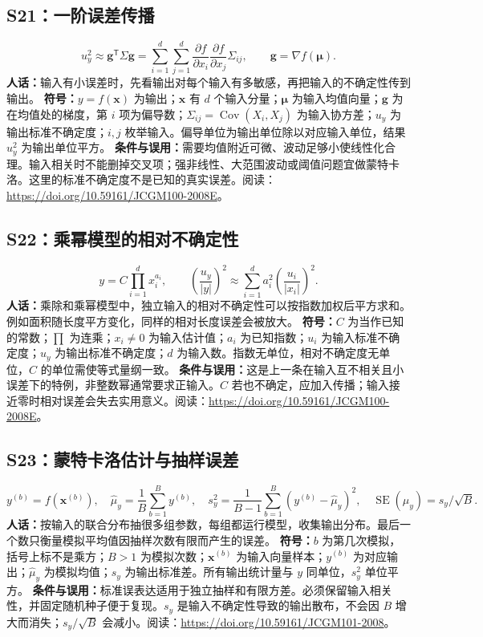 \documentclass[UTF8,zihao=-4,openany,oneside,fontset=windows]{ctexbook}
\begin{document}
\subsection{S21：一阶误差传播}
\begin{equation}
 u_y^2\approx\mathbf g^{\mathsf T}\Sigma\mathbf g
 =\sum_{i=1}^{d}\sum_{j=1}^{d}
 \frac{\partial f}{\partial x_i}\frac{\partial f}{\partial x_j}\Sigma_{ij},\qquad
 \mathbf g=\nabla f(\boldsymbol\mu).
\end{equation}
\textbf{人话：}输入有小误差时，先看输出对每个输入有多敏感，再把输入的不确定性传到输出。
\textbf{符号：}$y=f(\mathbf x)$ 为输出；$\mathbf x$ 有 $d$ 个输入分量；$\boldsymbol\mu$ 为输入均值向量；$\mathbf g$ 为在均值处的梯度，第 $i$ 项为偏导数；$\Sigma_{ij}=\operatorname{Cov}(X_i,X_j)$ 为输入协方差；$u_y$ 为输出标准不确定度；$i,j$ 枚举输入。偏导单位为输出单位除以对应输入单位，结果 $u_y^2$ 为输出单位平方。
\textbf{条件与误用：}需要均值附近可微、波动足够小使线性化合理。输入相关时不能删掉交叉项；强非线性、大范围波动或阈值问题宜做蒙特卡洛。这里的标准不确定度不是已知的真实误差。阅读：\url{https://doi.org/10.59161/JCGM100-2008E}。

\subsection{S22：乘幂模型的相对不确定性}
\begin{equation}
 y=C\prod_{i=1}^{d}x_i^{a_i},\qquad
 \left(\frac{u_y}{|y|}\right)^2\approx
 \sum_{i=1}^{d}a_i^2\left(\frac{u_i}{|x_i|}\right)^2.
\end{equation}
\textbf{人话：}乘除和乘幂模型中，独立输入的相对不确定性可以按指数加权后平方求和。例如面积随长度平方变化，同样的相对长度误差会被放大。
\textbf{符号：}$C$ 为当作已知的常数；$\prod$ 为连乘；$x_i\ne0$ 为输入估计值；$a_i$ 为已知指数；$u_i$ 为输入标准不确定度；$u_y$ 为输出标准不确定度；$d$ 为输入数。指数无单位，相对不确定度无单位，$C$ 的单位需使等式量纲一致。
\textbf{条件与误用：}这是上一条在输入互不相关且小误差下的特例，非整数幂通常要求正输入。$C$ 若也不确定，应加入传播；输入接近零时相对误差会失去实用意义。阅读：\url{https://doi.org/10.59161/JCGM100-2008E}。

\subsection{S23：蒙特卡洛估计与抽样误差}
\begin{equation}
 y^{(b)}=f(\mathbf x^{(b)}),\quad
 \hat\mu_y=\frac1B\sum_{b=1}^{B}y^{(b)},\quad
 s_y^2=\frac1{B-1}\sum_{b=1}^{B}(y^{(b)}-\hat\mu_y)^2,\quad
 \widehat{\operatorname{SE}}(\hat\mu_y)=s_y/\sqrt B.
\end{equation}
\textbf{人话：}按输入的联合分布抽很多组参数，每组都运行模型，收集输出分布。最后一个数只衡量模拟平均值因抽样次数有限而产生的误差。
\textbf{符号：}$b$ 为第几次模拟，括号上标不是乘方；$B>1$ 为模拟次数；$\mathbf x^{(b)}$ 为输入向量样本；$y^{(b)}$ 为对应输出；$\hat\mu_y$ 为模拟均值；$s_y$ 为输出标准差。所有输出统计量与 $y$ 同单位，$s_y^2$ 单位平方。
\textbf{条件与误用：}标准误表达适用于独立抽样和有限方差。必须保留输入相关性，并固定随机种子便于复现。$s_y$ 是输入不确定性导致的输出散布，不会因 $B$ 增大而消失；$s_y/\sqrt B$ 会减小。阅读：\url{https://doi.org/10.59161/JCGM101-2008}。
\end{document}
